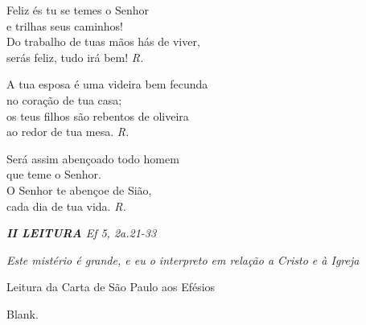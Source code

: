 \documentclass[a5paper,9pt]{memoir}
\begin{document}
{Feliz \'es tu se temes o Senhor\\
e trilhas seus caminhos!\\
Do trabalho de tuas m\~aos h\'as de viver,\\
ser\'as feliz, tudo ir\'a bem! {\itshape \color{mygray}R.}

A tua esposa \'e uma videira bem fecunda\\
no cora\c c\~ao de tua casa;\\
os teus filhos s\~ao rebentos de oliveira\\
ao redor de tua mesa. {\itshape \color{mygray}R.}

Ser\'a assim aben\c coado todo homem\\
que teme o Senhor.\\
O Senhor te aben\c coe de Si\~ao,\\
cada dia de tua vida. {\itshape \color{mygray}R.}

\vspace{0.3cm}
{\itshape \color{mygray}\textbf{II LEITURA} \hfill 
Ef 5, 2a.21-33}
\vspace{-0.3cm}
\begin{center}
	\itshape \color{mygray} \small
	\guillemotleft Este mist\'erio \'e grande, e eu o interpreto em relação a Cristo e à Igreja\guillemotright
\end{center}
\vspace{-0.3cm}

Leitura da Carta de S\~ao Paulo aos Ef\'esios

\begin{paracol}{2}
	{\color{white}Blank.}
	
	\switchcolumn
	

\end{paracol}}
\end{document}
